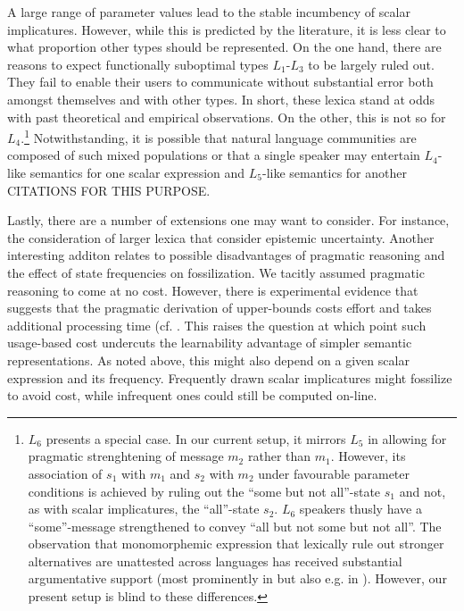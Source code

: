 \documentclass[a4paper]{article}
\newcommand{\hl}[1]{\textcolor[rgb]{.8,.33,.0}{#1}}%
\begin{document}
A large range of parameter values lead to the stable incumbency of scalar implicatures. However, while this is predicted by the literature, it is less clear to what proportion other types should be represented. On the one hand, there are  reasons to expect functionally suboptimal types $L_1$-$L_3$ to be largely ruled out. They fail to enable their users to communicate without substantial error both amongst themselves and with other types. In short, these lexica stand at odds with past theoretical and empirical observations. On the other, this is not so for $L_4$.\footnote{$L_6$ presents a special case. In our current setup, it mirrors $L_5$ in allowing for pragmatic strenghtening of message $m_2$ rather than $m_1$. However, its association of $s_1$ with $m_1$ and $s_2$ with $m_2$ under favourable parameter conditions is achieved by ruling out the ``some but not all''-state $s_1$ and not, as with scalar implicatures, the ``all''-state $s_2$. $L_6$ speakers thusly have a ``some''-message strengthened to convey ``all but not some but not all''. The observation that monomorphemic expression that lexically rule out stronger alternatives are unattested across languages has received substantial argumentative support (most prominently in \citealt[252-267]{horn:1984} but also e.g. in \citealt{horn:1972,traugott:2004,vdAuwera:2010}). However, our present setup is blind to these differences.} Notwithstanding, it is possible that natural language communities are composed of such mixed populations or that a single speaker may entertain $L_4$-like semantics for one scalar expression and $L_5$-like semantics for another \hl{CITATIONS FOR THIS PURPOSE}.   

Lastly, there are a number of extensions one may want to consider. For instance, the consideration of larger lexica that consider epistemic uncertainty. Another interesting additon relates to possible disadvantages of pragmatic reasoning and the effect of state frequencies on fossilization. We tacitly assumed pragmatic reasoning to come at no cost. However, there is experimental evidence that suggests  that the pragmatic derivation of upper-bounds costs effort and takes additional processing time (cf. \citealt{deNeys+schaeken:2007, huang+snedeker:2009}. This raises the question at which point such usage-based cost undercuts the learnability advantage of simpler semantic representations. As noted above, this might also depend on a given scalar expression and its frequency. Frequently drawn scalar implicatures might fossilize to avoid cost, while infrequent ones could still be computed on-line. 
\end{document}
